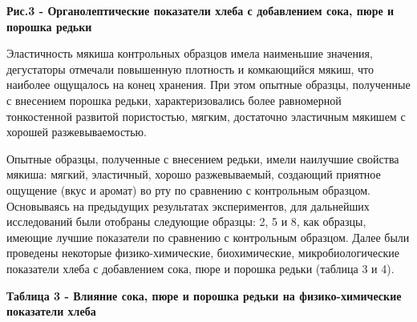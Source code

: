 {\bfseries Рис.3 - Органолептические показатели хлеба с добавлением сока,
пюре и порошка редьки}

\begin{multicols}{2}
Эластичность мякиша контрольных образцов имела наименьшие значения,
дегустаторы отмечали повышенную плотность и комкающийся мякиш, что
наиболее ощущалось на конец хранения. При этом опытные образцы,
полученные с внесением порошка редьки, характеризовались более
равномерной тонкостенной развитой пористостью, мягким, достаточно
эластичным мякишем с хорошей разжевываемостью.

Опытные образцы, полученные с внесением редьки, имели наилучшие свойства
мякиша: мягкий, эластичный, хорошо разжевываемый, создающий приятное
ощущение (вкус и аромат) во рту по сравнению с контрольным образцом.
Основываясь на предыдущих результатах экспериментов, для дальнейших
исследований были отобраны следующие образцы: 2, 5 и 8, как образцы,
имеющие лучшие показатели по сравнению с контрольным образцом. Далее
были проведены некоторые физико-химические, биохимические,
микробиологические показатели хлеба с добавлением сока, пюре и порошка
редьки (таблица 3 и 4).
\end{multicols}

{\bfseries Таблица 3 - Влияние сока, пюре и порошка редьки на физико-химические показатели хлеба}


